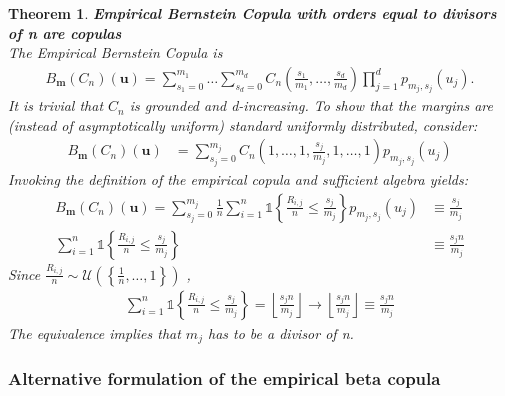 \documentclass[12pt]{report}
\newtheorem{theorem}{Theorem}[subsection]
\newcommand{\1}{\mathbf{1}}
\begin{document}
\begin{flushleft}
\begin{theorem}\label{empiricalBersteinPolynomialCopula}
\textit{\normalfont\parencite{SegersEBC}}\:
\textbf{Empirical Bernstein Copula with orders equal to divisors of n are copulas} \\
The Empirical Bernstein Copula is
\begin{align*}
B_{\textbf{m}}(C_{n})(\textbf{u}) = \sum\limits_{s_{1} = 0}^{m_{1}} \dots \sum\limits_{s_{d} = 0}^{m_{d}} C_{n} \left(\frac{s_{1}}{m_{1}}, \dots, \frac{s_{d}}{m_{d}} \right) \prod\limits_{j = 1}^{d} p_{m_{j},s_{j}}(u_{j}).
\end{align*}
It is trivial that $C_{n}$ is grounded and d-increasing. To show that the margins are (instead of asymptotically uniform) standard uniformly distributed, consider:
\begin{align*}
B_{\textbf{m}}(C_{n})(\textbf{u}) &= \sum\limits_{s_{j} = 0}^{m_{j}} C_{n}(1, \dots, 1, \frac{s_{j}}{m_{j}}, 1, \dots, 1) p_{m_{j},s_{j}}(u_{j})
\end{align*}
Invoking the definition of the empirical copula and sufficient algebra yields:
\begin{align*}
B_{\textbf{m}}(C_{n})(\textbf{u}) = \sum\limits_{s_{j} = 0}^{m_{j}} \frac{1}{n} \sum\limits_{i = 1}^{n} \mathds{1} \left\{ \frac{R_{i,j}}{n} \le \frac{s_{j}}{m_{j}} \right\} p_{m_{j},s_{j}}(u_{j}) &\equiv \frac{s_{j}}{m_{j}} \\
\sum\limits_{i = 1}^{n} \mathds{1} \left\{ \frac{R_{i,j}}{n} \le \frac{s_{j}}{m_{j}} \right\} &\equiv \frac{s_{j}n}{m_{j}}
\end{align*}
Since $\frac{R_{i,j}}{n} \sim \mathcal{U}\left(\left\{\frac{1}{n}, \dots, 1 \right\}\right)$ , 
\begin{align*}
\sum\limits_{i = 1}^{n} \mathds{1} \left\{ \frac{R_{i,j}}{n} \le \frac{s_{j}}{m_{j}} \right\} = \left\lfloor \frac{s_{j}n}{m_{j}} \right\rfloor \rightarrow \left\lfloor \frac{s_{j}n}{m_{j}} \right\rfloor \equiv \frac{s_{j}n}{m_{j}}    
\end{align*}
The equivalence implies that $m_{j}$ has to be a divisor of n.
\end{theorem}

\newpage
\subsubsection{Alternative formulation of the empirical beta copula}


\end{flushleft}
\end{document}
